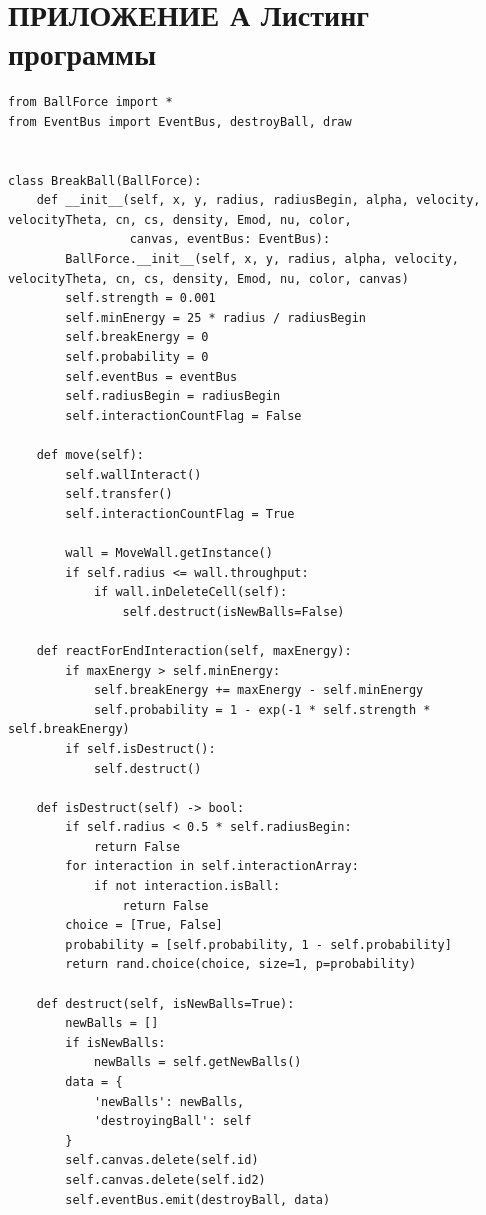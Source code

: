 \documentclass[utf8x, 14pt, oneside, a4paper]{article}
\begin{document}
\begin{thebibliography}{99}
\end{thebibliography}
		\pagebreak
		
\section*{ПРИЛОЖЕНИЕ А Листинг программы}
\begin{lstlisting}
from BallForce import *
from EventBus import EventBus, destroyBall, draw


class BreakBall(BallForce):
    def __init__(self, x, y, radius, radiusBegin, alpha, velocity, velocityTheta, cn, cs, density, Emod, nu, color,
                 canvas, eventBus: EventBus):
        BallForce.__init__(self, x, y, radius, alpha, velocity, velocityTheta, cn, cs, density, Emod, nu, color, canvas)
        self.strength = 0.001
        self.minEnergy = 25 * radius / radiusBegin
        self.breakEnergy = 0
        self.probability = 0
        self.eventBus = eventBus
        self.radiusBegin = radiusBegin
        self.interactionCountFlag = False

    def move(self):
        self.wallInteract()
        self.transfer()
        self.interactionCountFlag = True

        wall = MoveWall.getInstance()
        if self.radius <= wall.throughput:
            if wall.inDeleteCell(self):
                self.destruct(isNewBalls=False)

    def reactForEndInteraction(self, maxEnergy):
        if maxEnergy > self.minEnergy:
            self.breakEnergy += maxEnergy - self.minEnergy
            self.probability = 1 - exp(-1 * self.strength * self.breakEnergy)
        if self.isDestruct():
            self.destruct()

    def isDestruct(self) -> bool:
        if self.radius < 0.5 * self.radiusBegin:
            return False
        for interaction in self.interactionArray:
            if not interaction.isBall:
                return False
        choice = [True, False]
        probability = [self.probability, 1 - self.probability]
        return rand.choice(choice, size=1, p=probability)

    def destruct(self, isNewBalls=True):
        newBalls = []
        if isNewBalls:
            newBalls = self.getNewBalls()
        data = {
            'newBalls': newBalls,
            'destroyingBall': self
        }
        self.canvas.delete(self.id)
        self.canvas.delete(self.id2)
        self.eventBus.emit(destroyBall, data)


\end{lstlisting}
\end{document}

